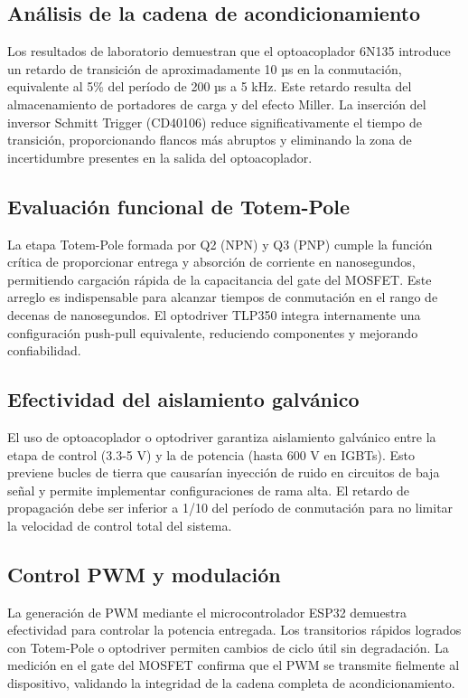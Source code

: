 \documentclass[12pt]{article}
\begin{document}
\subsection{Análisis de la cadena de acondicionamiento}

Los resultados de laboratorio demuestran que el optoacoplador 6N135 introduce un retardo de transición de aproximadamente 10 µs en la conmutación, equivalente al 5\% del período de 200 µs a 5 kHz. Este retardo resulta del almacenamiento de portadores de carga y del efecto Miller. La inserción del inversor Schmitt Trigger (CD40106) reduce significativamente el tiempo de transición, proporcionando flancos más abruptos y eliminando la zona de incertidumbre presentes en la salida del optoacoplador.

\subsection{Evaluación funcional de Totem-Pole}

La etapa Totem-Pole formada por Q2 (NPN) y Q3 (PNP) cumple la función crítica de proporcionar entrega y absorción de corriente en nanosegundos, permitiendo cargación rápida de la capacitancia del gate del MOSFET. Este arreglo es indispensable para alcanzar tiempos de conmutación en el rango de decenas de nanosegundos. El optodriver TLP350 integra internamente una configuración push-pull equivalente, reduciendo componentes y mejorando confiabilidad.

\subsection{Efectividad del aislamiento galvánico}

El uso de optoacoplador o optodriver garantiza aislamiento galvánico entre la etapa de control (3.3-5 V) y la de potencia (hasta 600 V en IGBTs). Esto previene bucles de tierra que causarían inyección de ruido en circuitos de baja señal y permite implementar configuraciones de rama alta. El retardo de propagación debe ser inferior a 1/10 del período de conmutación para no limitar la velocidad de control total del sistema.

\subsection{Control PWM y modulación}

La generación de PWM mediante el microcontrolador ESP32 demuestra efectividad para controlar la potencia entregada. Los transitorios rápidos logrados con Totem-Pole o optodriver permiten cambios de ciclo útil sin degradación. La medición en el gate del MOSFET confirma que el PWM se transmite fielmente al dispositivo, validando la integridad de la cadena completa de acondicionamiento.
\end{document}
